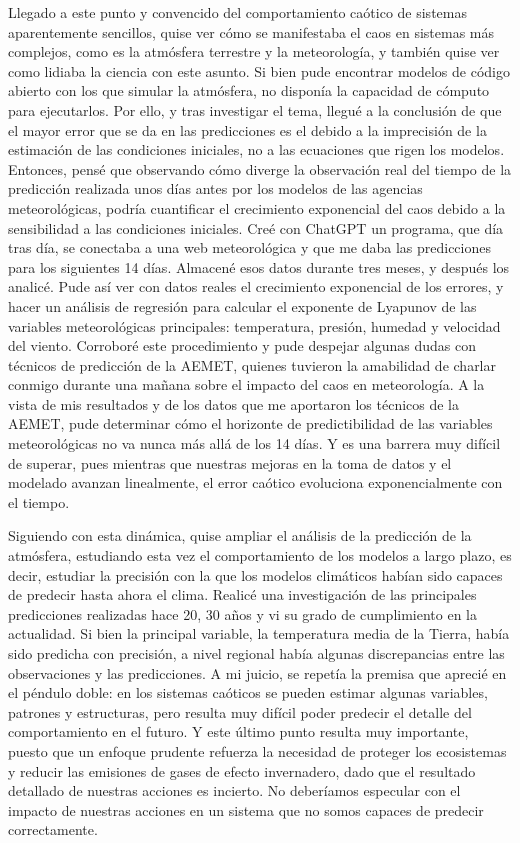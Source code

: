 \documentclass[
  11pt,
  a4paper,
  DIV=11,
  numbers=noendperiod]{scrreprt}
\begin{document}
Llegado a este punto y convencido del comportamiento caótico de sistemas
aparentemente sencillos, quise ver cómo se manifestaba el caos en
sistemas más complejos, como es la atmósfera terrestre y la
meteorología, y también quise ver como lidiaba la ciencia con este
asunto. Si bien pude encontrar modelos de código abierto con los que
simular la atmósfera, no disponía la capacidad de cómputo para
ejecutarlos. Por ello, y tras investigar el tema, llegué a la conclusión
de que el mayor error que se da en las predicciones es el debido a la
imprecisión de la estimación de las condiciones iniciales, no a las
ecuaciones que rigen los modelos. Entonces, pensé que observando cómo
diverge la observación real del tiempo de la predicción realizada unos
días antes por los modelos de las agencias meteorológicas, podría
cuantificar el crecimiento exponencial del caos debido a la sensibilidad
a las condiciones iniciales. Creé con ChatGPT un programa, que día tras
día, se conectaba a una web meteorológica y que me daba las predicciones
para los siguientes 14 días. Almacené esos datos durante tres meses, y
después los analicé. Pude así ver con datos reales el crecimiento
exponencial de los errores, y hacer un análisis de regresión para
calcular el exponente de Lyapunov de las variables meteorológicas
principales: temperatura, presión, humedad y velocidad del viento.
Corroboré este procedimiento y pude despejar algunas dudas con técnicos
de predicción de la AEMET, quienes tuvieron la amabilidad de charlar
conmigo durante una mañana sobre el impacto del caos en meteorología. A
la vista de mis resultados y de los datos que me aportaron los técnicos
de la AEMET, pude determinar cómo el horizonte de predictibilidad de las
variables meteorológicas no va nunca más allá de los 14 días. Y es una
barrera muy difícil de superar, pues mientras que nuestras mejoras en la
toma de datos y el modelado avanzan linealmente, el error caótico
evoluciona exponencialmente con el tiempo.

Siguiendo con esta dinámica, quise ampliar el análisis de la predicción
de la atmósfera, estudiando esta vez el comportamiento de los modelos a
largo plazo, es decir, estudiar la precisión con la que los modelos
climáticos habían sido capaces de predecir hasta ahora el clima. Realicé
una investigación de las principales predicciones realizadas hace 20, 30
años y vi su grado de cumplimiento en la actualidad. Si bien la
principal variable, la temperatura media de la Tierra, había sido
predicha con precisión, a nivel regional había algunas discrepancias
entre las observaciones y las predicciones. A mi juicio, se repetía la
premisa que aprecié en el péndulo doble: en los sistemas caóticos se
pueden estimar algunas variables, patrones y estructuras, pero resulta
muy difícil poder predecir el detalle del comportamiento en el futuro. Y
este último punto resulta muy importante, puesto que un enfoque prudente
refuerza la necesidad de proteger los ecosistemas y reducir las
emisiones de gases de efecto invernadero, dado que el resultado
detallado de nuestras acciones es incierto. No deberíamos especular con
el impacto de nuestras acciones en un sistema que no somos capaces de
predecir correctamente.
\end{document}
